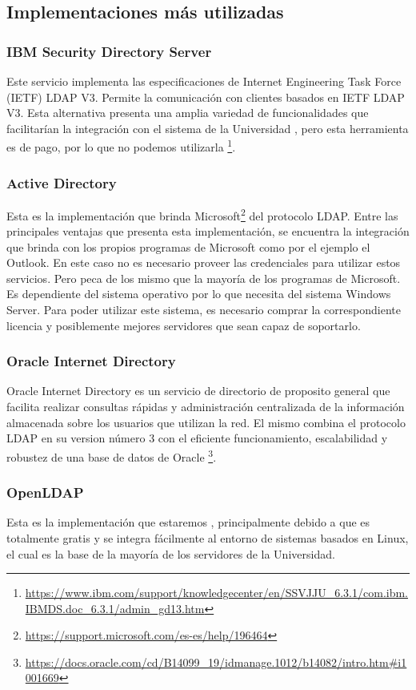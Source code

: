 \subsection{Implementaciones más utilizadas}
\subsubsection{IBM Security Directory Server}
Este servicio implementa las especificaciones de Internet Engineering Task Force (IETF) LDAP 
V3. Permite la comunicación con clientes basados en IETF LDAP V3. Esta alternativa presenta 
una amplia variedad de funcionalidades que facilitarían la integración con el sistema de la 
Universidad , pero esta herramienta es de pago, por lo que no podemos utilizarla
\footnote{ \url{https://www.ibm.com/support/knowledgecenter/en/SSVJJU_6.3.1/com.ibm.IBMDS.doc_6.3.1/admin_gd13.htm} }.

\subsubsection{Active Directory}
Esta es la implementación que brinda Microsoft\footnote{\url{https://support.microsoft.com/es-es/help/196464}}
del protocolo LDAP. Entre las principales ventajas que presenta esta implementación, se encuentra
la integración que brinda con los propios programas de Microsoft como por el ejemplo el 
Outlook. En este caso no es necesario proveer las credenciales para utilizar estos servicios.
Pero peca de los mismo que la mayoría de los programas de Microsoft. Es dependiente del sistema
operativo por lo que necesita del sistema Windows Server. Para poder utilizar este sistema,
es necesario comprar la correspondiente licencia y posiblemente mejores servidores que sean capaz
de soportarlo.
\subsubsection{Oracle Internet Directory}
Oracle Internet Directory es un servicio de directorio de proposito general que facilita realizar
consultas rápidas y administración centralizada de la información almacenada sobre los usuarios
que utilizan la red. El mismo combina el protocolo LDAP en su version número 3 con el eficiente
funcionamiento, escalabilidad y robustez de una base de datos de Oracle \footnote{ 
\url{https://docs.oracle.com/cd/B14099\_19/idmanage.1012/b14082/intro.htm\#i1001669}}.
\subsubsection{OpenLDAP}
Esta es la implementaci\'on que estaremos , principalmente debido a que es totalmente gratis y se integra f\'acilmente al entorno de sistemas basados en Linux, el cual es la base de la mayor\'ia de los servidores de la Universidad.

